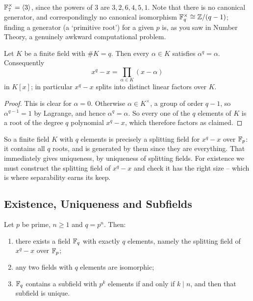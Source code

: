 \documentclass[a4paper]{scrartcl}
\begin{document}
\begin{example}
	$\mathbb{F}_7^\times = \langle 3 \rangle$, since the powers of $3$ are $3, 2, 6, 4, 5, 1$. Note that there is no canonical generator, and correspondingly no canonical isomorphism $\mathbb{F}_q^\times \cong \mathbb{Z}/(q-1)$; finding a generator (a `primitive root') for a given $p$ is, as you saw in Number Theory, a genuinely awkward computational problem.
\end{example}

\begin{lemma}\label{lem:fermat}
	Let $K$ be a finite field with $\#K = q$. Then every $\alpha \in K$ satisfies $\alpha^q = \alpha$. Consequently
	$$x^q - x = \prod_{\alpha \in K}(x - \alpha)$$
	in $K[x]$; in particular $x^q - x$ splits into distinct linear factors over $K$.
\end{lemma}

\begin{proof}
	This is clear for $\alpha = 0$. Otherwise $\alpha \in K^\times$, a group of order $q-1$, so $\alpha^{q-1} = 1$ by Lagrange, and hence $\alpha^q = \alpha$. So every one of the $q$ elements of $K$ is a root of the degree $q$ polynomial $x^q - x$, which therefore factors as claimed.
\end{proof}

So a finite field $K$ with $q$ elements is precisely a splitting field for $x^q - x$ over $\mathbb{F}_p$: it contains all $q$ roots, and is generated by them since they are everything. That immediately gives uniqueness, by uniqueness of splitting fields. For existence we must construct the splitting field of $x^q-x$ and check it has the right size -- which is where separability earns its keep.

\subsection{Existence, Uniqueness and Subfields}

\begin{theorem}\label{thm:finitefields}
	Let $p$ be prime, $n \geq 1$ and $q = p^n$. Then:
	\begin{enumerate}[label=(\roman*)]
		\item there exists a field $\mathbb{F}_q$ with exactly $q$ elements, namely the splitting field of $x^q-x$ over $\mathbb{F}_p$;
		\item any two fields with $q$ elements are isomorphic;
		\item $\mathbb{F}_q$ contains a subfield with $p^k$ elements if and only if $k \mid n$, and then that subfield is unique.
	\end{enumerate}
\end{theorem}
\end{document}
